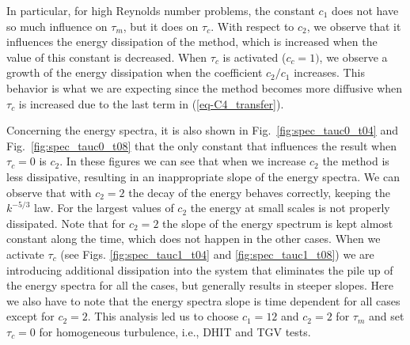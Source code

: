 In particular, for high Reynolds number problems, the constant $c_1$ does not have so much influence on $\tau_m$, but it does on $\tau_c$. With respect to $c_2$, we observe that it influences the energy dissipation of the method, which is increased when the value of this constant is decreased. When $\tau_c$ is activated ($c_c=1)$, we observe a growth of the energy dissipation when the coefficient $c_2/c_1$ increases. This behavior is what we are expecting since the method becomes more diffusive  when $\tau_c$ is increased due to the last term in (\ref{eq-C4_transfer}).


Concerning the energy spectra, it is also shown in Fig.~\ref{fig:spec_tauc0_t04} and Fig.~\ref{fig:spec_tauc0_t08} that the only constant that influences the result when $\tau_c=0$ is $c_2$. In these figures we can see that when we increase $c_2$ the method is less dissipative, resulting in an inappropriate slope of the energy spectra. We can observe that with $c_2=2$ the decay of the energy behaves correctly, keeping the $k^{-5/3}$ law. For the largest values of $c_2$ the energy at small scales is not properly dissipated. Note that for $c_2=2$ the slope of the energy spectrum is kept almost constant along the time, which does not happen in the other cases. When we activate $\tau_c$ (see Figs. \ref{fig:spec_tauc1_t04} and \ref{fig:spec_tauc1_t08}) we are introducing additional dissipation into the system that eliminates the pile up of the energy spectra for all the cases, but generally results in steeper slopes. Here we also have to note that the energy spectra slope is time dependent for all cases except for $c_2=2$.
This analysis led us to choose $c_1=12$ and $c_2=2$ for $\tau_m$ and set $\tau_c=0$ for homogeneous turbulence, i.e., DHIT and TGV tests.

